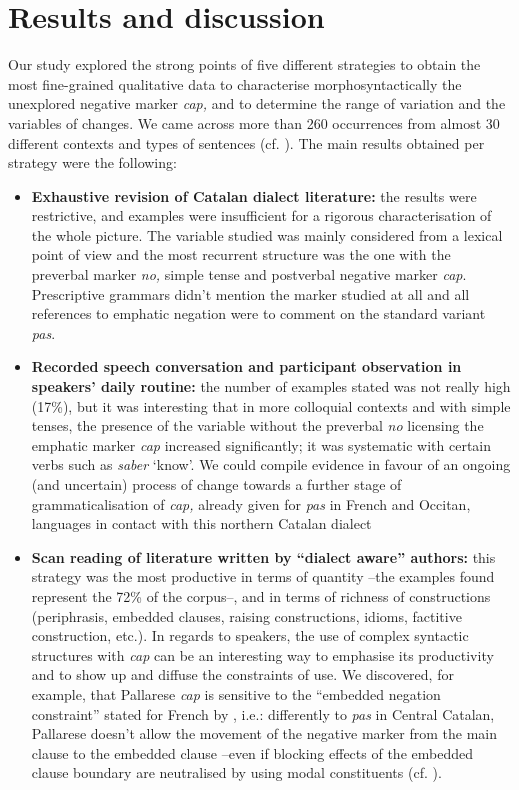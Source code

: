 \documentclass[output=paper]{LSP/langsci}
\begin{document}
\section{Results and discussion}
Our study explored the strong points of five different strategies to obtain the most fine-grained qualitative data to characterise morphosyntactically the unexplored negative marker \textit{cap, }and to determine the range of variation and the variables of changes. We came across more than 260 occurrences from almost 30 different contexts and types of sentences (cf. \citealt{llop_negacio_2013}). The main results obtained per strategy were the following:

\begin{itemize}
\item \textbf{Exhaustive revision of Catalan dialect literature:} the results were restrictive, and examples were insufficient for a rigorous characterisation of the whole picture. The variable studied was mainly considered from a lexical point of view and the most recurrent structure was the one with the preverbal marker \textit{no, }simple tense and postverbal negative marker \textit{cap}. Prescriptive grammars didn’t mention the marker studied at all and all references to emphatic negation were to comment on the standard variant \textit{pas}.
\item \textbf{Recorded speech conversation and participant observation in speakers’ daily routine: }the number of examples stated was not really high (17\%), but it was interesting that in more colloquial contexts and with simple tenses, the presence of the variable without the preverbal \textit{no} licensing the emphatic marker \textit{cap} increased significantly; it was systematic with certain verbs such as \textit{saber }‘know’. We could compile evidence in favour of an ongoing (and uncertain) process of change towards a further stage of grammaticalisation of \textit{cap,} already given for \textit{pas }in French and Occitan, languages in contact with this northern Catalan dialect
\item \textbf{Scan reading of literature written by “dialect aware” authors: }this strategy was the most productive in terms of quantity –the examples found represent the 72\% of the corpus–, and in terms of richness of constructions (periphrasis, embedded clauses, raising constructions, idioms, factitive construction, etc.). In regards to speakers, the use of complex syntactic structures with \textit{cap }can be an interesting way to emphasise its productivity and to show up and diffuse the constraints of use. We discovered, for example, that Pallarese \textit{cap }is sensitive to the “embedded negation constraint” stated for French by \citet[193]{horn_remarks_1978}, i.e.: differently to \textit{pas }in Central Catalan, Pallarese doesn’t allow the movement of the negative marker from the main clause to the embedded clause –even if blocking effects of the embedded clause boundary are neutralised by using modal constituents (cf. \citealt{espinal_two_1993,llop_negacio_2013}).

\end{itemize}
\end{document}
